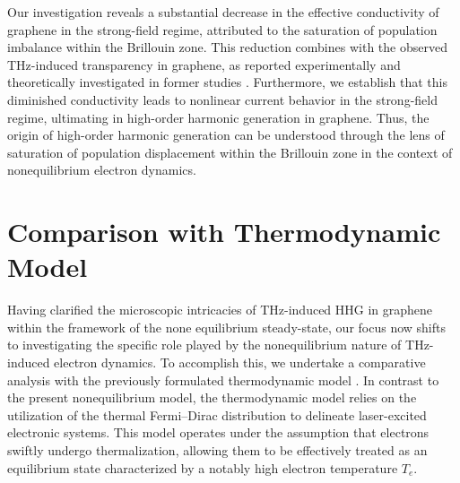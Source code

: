 Our investigation reveals a substantial decrease in the effective conductivity of graphene in the strong-field regime, attributed to the saturation of population imbalance within the Brillouin zone. This reduction combines with the observed THz-induced transparency in graphene, as reported experimentally \cite{Hwang2013, Paul_2013, doi:10.1063/1.4902999} and theoretically investigated in former studies \cite{sato2021nonlinear}. Furthermore, we establish that this diminished conductivity leads to nonlinear current behavior in the strong-field regime, ultimating in high-order harmonic generation in graphene. Thus, the origin of high-order harmonic generation can be understood through the lens of saturation of population displacement within the Brillouin zone in the context of nonequilibrium electron dynamics.
\section{Comparison with Thermodynamic Model \label{sec:thermo}}
Having clarified the microscopic intricacies of THz-induced \gls{HHG} in graphene within the framework of the none equilibrium steady-state, our focus now shifts to investigating the specific role played by the nonequilibrium nature of THz-induced electron dynamics. To accomplish this, we undertake a comparative analysis with the previously formulated thermodynamic model \cite{mics2015thermodynamic}. In contrast to the present nonequilibrium model, the thermodynamic model relies on the utilization of the thermal Fermi--Dirac distribution to delineate laser-excited electronic systems. This model operates under the assumption that electrons swiftly undergo thermalization, allowing them to be effectively treated as an equilibrium state characterized by a notably high electron temperature $T_e$.

